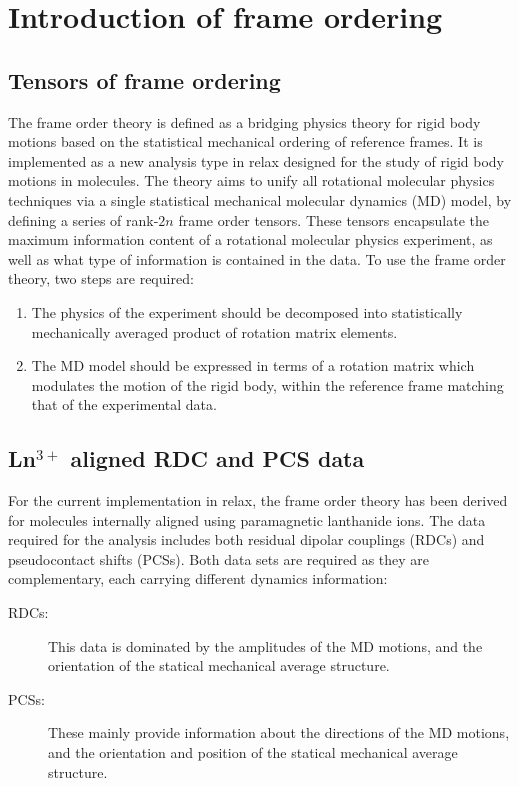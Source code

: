 
\section{Introduction of frame ordering}




\subsection{Tensors of frame ordering}

The frame order theory is defined as a bridging physics theory for rigid body motions based on the statistical mechanical ordering of reference frames.
It is implemented as a new analysis type in relax designed for the study of rigid body motions in molecules.
The theory aims to unify all rotational molecular physics techniques via a single statistical mechanical molecular dynamics (MD) model, by defining a series of rank-$2n$ frame order tensors.
These tensors encapsulate the maximum information content of a rotational molecular physics experiment, as well as what type of information is contained in the data.
To use the frame order theory, two steps are required:
\begin{enumerate}
\item The physics of the experiment should be decomposed into statistically mechanically averaged product of rotation matrix elements.
\item The MD model should be expressed in terms of a rotation matrix which modulates the motion of the rigid body, within the reference frame matching that of the experimental data.
\end{enumerate}





\subsection{Ln$^{3+}$ aligned RDC and PCS data}

For the current implementation in relax, the frame order theory has been derived for molecules internally aligned using paramagnetic lanthanide ions.
The data required for the analysis includes both residual dipolar couplings (RDCs) and pseudocontact shifts (PCSs).
Both data sets are required as they are complementary, each carrying different dynamics information:
\begin{description}
\item[RDCs:]  This data is dominated by the amplitudes of the MD motions, and the orientation of the statical mechanical average structure.
\item[PCSs:]  These mainly provide information about the directions of the MD motions, and the orientation and position of the statical mechanical average structure.
\end{description}

